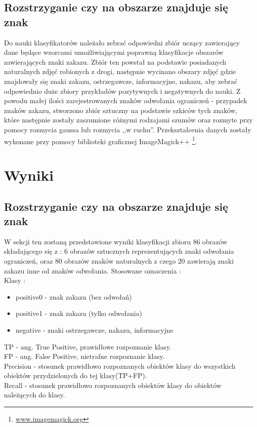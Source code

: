 \documentclass{classrep}
\begin{document}
\subsection{Rozstrzyganie czy na obszarze znajduje się znak}
Do nauki klasyfikatorów należało zebrać odpowiedni zbiór uczący zawierający dane będące wzorcami umożliwiającymi poprawną klasyfikacje obszarów zawierających znaki zakazu. Zbiór ten powstał na podstawie posiadanych naturalnych zdjęć robionych z drogi, następnie wycinano obszary zdjęć gdzie znajdowały się znaki zakazu, ostrzegawcze, informacyjne, nakazu, aby zebrać odpowiednio duże zbiory przykładów pozytywnych i negatywnych do nauki. Z powodu małej ilości zarejestrowanych znaków odwołania ograniczeń - przypadek znaków zakazu, stworzono zbiór sztuczny na podstawie szkiców tych znaków, które następnie zostały zaszumione różnymi rodzajami szumów oraz rozmyte przy pomocy rozmycia gaussa lub rozmycia ,,w ruchu''. Przekształcenia danych zostały wykonane przy pomocy biblioteki graficznej ImageMagick++ \footnote{\url{www.imagemagick.org}}.

\section{Wyniki}

\subsection{Rozstrzyganie czy na obszarze znajduje się znak}

W sekcji ten zostaną przedstawione wyniki klasyfikacji zbioru 86 obrazów składającego się z : 6 obrazów sztucznych reprezentujących znaki odwołania ograniczeń, oraz 80 obrazów znaków naturalnych z czego 20 zawierają znaki zakazu inne od znaków odwołania.
Stosowane oznaczenia :\\
Klasy :
\begin{itemize}
\item positive0 - znak zakazu (bez odwołań)
\item positive1 - znak zakazu (tylko odwołania)
\item negative - znaki ostrzegawcze, nakazu, informacyjne
\end{itemize} 
TP - ang. True Positive, prawidłowe rozpoznanie klasy.\\
FP - ang. False Positive, nietrafne rozpoznanie klasy.\\
Precision - stosunek prawidłowo rozpoznanych obiektów klasy do wszystkich obiektów przydzielonych do tej klasy(TP+FP).\\
Recall - stosunek prawidłowo rozpoznanych obiektów klasy do obiektów należących do klasy.
\end{document}
